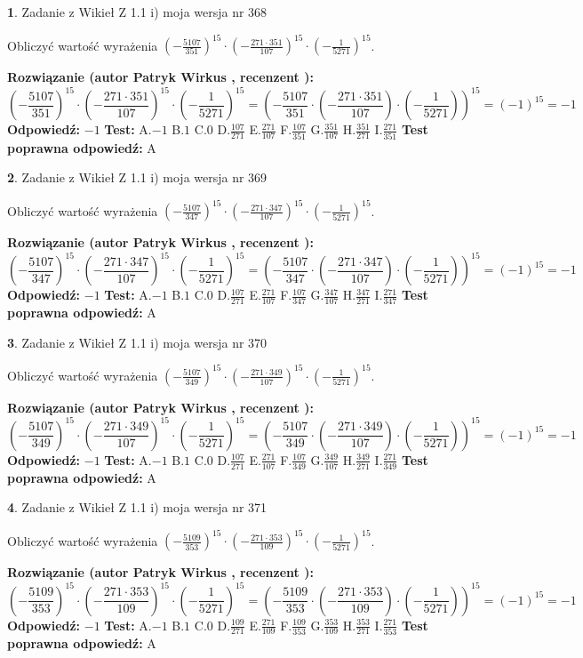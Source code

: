\documentclass[12pt, a4paper]{article}
\theoremstyle{definition} %
\newtheorem{zad}{}
\newcommand{\zadStart}[1]{\begin{zad}#1\newline}
\newcommand{\zadStop}{\end{zad}}
\newcommand{\rozwStart}[2]{\noindent \textbf{Rozwiązanie (autor #1 , recenzent #2): }\newline}
\newcommand{\rozwStop}{\newline}
\newcommand{\odpStart}{\noindent \textbf{Odpowiedź:}\newline}
\newcommand{\odpStop}{\newline}
\newcommand{\testStart}{\noindent \textbf{Test:}\newline}
\newcommand{\testStop}{\newline}
\newcommand{\kluczStart}{\noindent \textbf{Test poprawna odpowiedź:}\newline}
\newcommand{\kluczStop}{\newline}
\begin{document}
\zadStart{Zadanie z Wikieł Z 1.1 i) moja wersja nr 368}

Obliczyć wartość wyrażenia $(-\frac{5107}{351})^{15} \cdot (-\frac{271 \cdot 351}{107})^{15} \cdot (-\frac{1}{5271})^{15}$.
\zadStop
\rozwStart{Patryk Wirkus}{}
$$(-\frac{5107}{351})^{15} \cdot (-\frac{271 \cdot 351}{107})^{15} \cdot (-\frac{1}{5271})^{15} = (-\frac{5107}{351} \cdot (-\frac{271 \cdot 351}{107}) \cdot (-\frac{1}{5271}))^{15} = (-1)^{15} = -1$$
\rozwStop
\odpStart
$-1$
\odpStop
\testStart
A.$-1$ B.$1$ C.$0$ D.$\frac{107}{271}$ E.$\frac{271}{107}$
F.$\frac{107}{351}$ G.$\frac{351}{107}$
H.$\frac{351}{271}$
I.$\frac{271}{351}$
\testStop
\kluczStart
A
\kluczStop



\zadStart{Zadanie z Wikieł Z 1.1 i) moja wersja nr 369}

Obliczyć wartość wyrażenia $(-\frac{5107}{347})^{15} \cdot (-\frac{271 \cdot 347}{107})^{15} \cdot (-\frac{1}{5271})^{15}$.
\zadStop
\rozwStart{Patryk Wirkus}{}
$$(-\frac{5107}{347})^{15} \cdot (-\frac{271 \cdot 347}{107})^{15} \cdot (-\frac{1}{5271})^{15} = (-\frac{5107}{347} \cdot (-\frac{271 \cdot 347}{107}) \cdot (-\frac{1}{5271}))^{15} = (-1)^{15} = -1$$
\rozwStop
\odpStart
$-1$
\odpStop
\testStart
A.$-1$ B.$1$ C.$0$ D.$\frac{107}{271}$ E.$\frac{271}{107}$
F.$\frac{107}{347}$ G.$\frac{347}{107}$
H.$\frac{347}{271}$
I.$\frac{271}{347}$
\testStop
\kluczStart
A
\kluczStop



\zadStart{Zadanie z Wikieł Z 1.1 i) moja wersja nr 370}

Obliczyć wartość wyrażenia $(-\frac{5107}{349})^{15} \cdot (-\frac{271 \cdot 349}{107})^{15} \cdot (-\frac{1}{5271})^{15}$.
\zadStop
\rozwStart{Patryk Wirkus}{}
$$(-\frac{5107}{349})^{15} \cdot (-\frac{271 \cdot 349}{107})^{15} \cdot (-\frac{1}{5271})^{15} = (-\frac{5107}{349} \cdot (-\frac{271 \cdot 349}{107}) \cdot (-\frac{1}{5271}))^{15} = (-1)^{15} = -1$$
\rozwStop
\odpStart
$-1$
\odpStop
\testStart
A.$-1$ B.$1$ C.$0$ D.$\frac{107}{271}$ E.$\frac{271}{107}$
F.$\frac{107}{349}$ G.$\frac{349}{107}$
H.$\frac{349}{271}$
I.$\frac{271}{349}$
\testStop
\kluczStart
A
\kluczStop



\zadStart{Zadanie z Wikieł Z 1.1 i) moja wersja nr 371}

Obliczyć wartość wyrażenia $(-\frac{5109}{353})^{15} \cdot (-\frac{271 \cdot 353}{109})^{15} \cdot (-\frac{1}{5271})^{15}$.
\zadStop
\rozwStart{Patryk Wirkus}{}
$$(-\frac{5109}{353})^{15} \cdot (-\frac{271 \cdot 353}{109})^{15} \cdot (-\frac{1}{5271})^{15} = (-\frac{5109}{353} \cdot (-\frac{271 \cdot 353}{109}) \cdot (-\frac{1}{5271}))^{15} = (-1)^{15} = -1$$
\rozwStop
\odpStart
$-1$
\odpStop
\testStart
A.$-1$ B.$1$ C.$0$ D.$\frac{109}{271}$ E.$\frac{271}{109}$
F.$\frac{109}{353}$ G.$\frac{353}{109}$
H.$\frac{353}{271}$
I.$\frac{271}{353}$
\testStop
\kluczStart
A
\kluczStop
\end{document}
